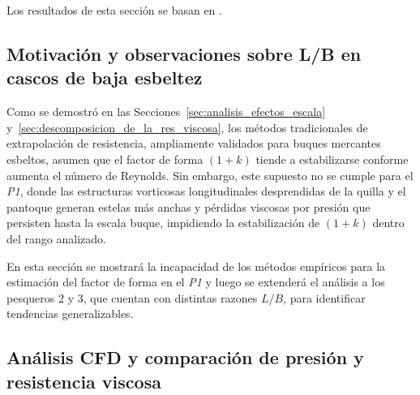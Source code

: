Los resultados de esta sección se basan en \citet{oyuela2026oceaneng}.

\subsection{Motivación y observaciones sobre L/B en cascos de baja esbeltez}

Como se demostró en las Secciones~\ref{sec:analisis_efectos_escala} 
y~\ref{sec:descomposicion_de_la_res_viscosa}, los métodos tradicionales 
de extrapolación de resistencia, ampliamente validados para buques 
mercantes esbeltos, asumen que el factor de forma $(1+k)$ tiende a 
estabilizarse conforme aumenta el número de Reynolds. Sin embargo, este 
supuesto no se cumple para el \textit{P1}, donde las estructuras 
vorticosas longitudinales desprendidas de la quilla y el pantoque generan 
estelas más anchas y pérdidas viscosas por presión que persisten hasta la 
escala buque, impidiendo la estabilización de $(1+k)$ dentro del rango 
analizado.
 
En esta sección se mostrará la incapacidad de los métodos empíricos para la estimación del factor de forma en el \textit{P1} y luego se extenderá el análisis a los pesqueros 2 y 3, que cuentan con distintas razones $L/B$, para identificar tendencias generalizables.

\subsection{Análisis CFD y comparación de presión y resistencia viscosa}

